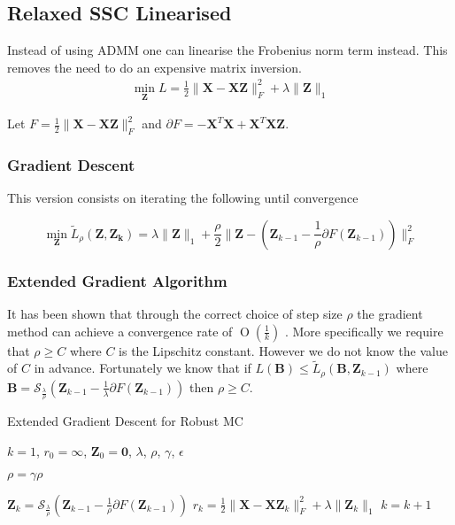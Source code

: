 \documentclass{article}
\newcommand{\BigO}[1]{\ensuremath{\operatorname{O}\left(#1\right)}}
\begin{document}
\subsection{Relaxed SSC Linearised}

Instead of using ADMM one can linearise the Frobenius norm term instead. This removes the need to do an expensive matrix inversion.
\begin{align}
\min_{\mathbf Z} L = \frac12\|\mathbf X - \mathbf X\mathbf Z\|^2_F + \lambda\|\mathbf Z\|_{1}
\end{align}

Let $F = \frac12\|\mathbf X - \mathbf X\mathbf Z\|^2_F$ and $\partial F = - \mathbf X^T \mathbf X + \mathbf X^T \mathbf{X Z}$.

\subsubsection{Gradient Descent}

This version consists on iterating the following until convergence

\[
\min_{\mathbf Z} \widetilde{L}_{\rho}(\mathbf{Z, Z_k}) =  \lambda\|\mathbf Z\|_{1} + \frac{\rho}{2} \| \mathbf Z - ( \mathbf Z_{k-1} - \frac{1}{\rho} \partial F(\mathbf Z_{k-1})) \|_F^2
\]

\subsubsection{Extended Gradient Algorithm}

It has been shown that through the correct choice of step size $\rho$ the gradient method can achieve a convergence rate of $\BigO{\frac{1}{k}}$ \cite{ji2009accelerated}. More specifically we require that $\rho \geq C$ where $C$ is the Lipschitz constant. However we do not know the value of $C$ in advance. Fortunately we know that if $L(\mathbf B) \leq \widetilde{L}_{\rho}(\mathbf B, \mathbf Z_{k-1})$ where $\mathbf B = \mathcal S_{\frac{\lambda}{\rho}}(\mathbf Z_{k-1} - \frac1{\lambda}\partial F(\mathbf Z_{k-1}))$ then $\rho \geq C$. 

\begin{algorithm}
\caption{Extended Gradient Descent for Robust MC}
\begin{algorithmic}

\REQUIRE $k = 1$, $r_0 = \infty$, $\mathbf Z_0 = \mathbf 0$, $\lambda$, $\rho$, $\gamma$, $\epsilon$


	
		\STATE $\rho = \gamma \rho$	
	
	\ENDWHILE

	\STATE $\mathbf Z_k = \mathcal S_{\frac{\lambda}{\rho}}(\mathbf Z_{k-1} - \frac1{\rho}\partial F(\mathbf Z_{k-1}))$
	\STATE $r_k = \frac12\|\mathbf X - \mathbf X\mathbf Z_k\|^2_F + \lambda\|\mathbf Z_k\|_{1}$
	\STATE $k = k + 1$
	
\ENDWHILE

\end{algorithmic}
\end{algorithm}
\end{document}
